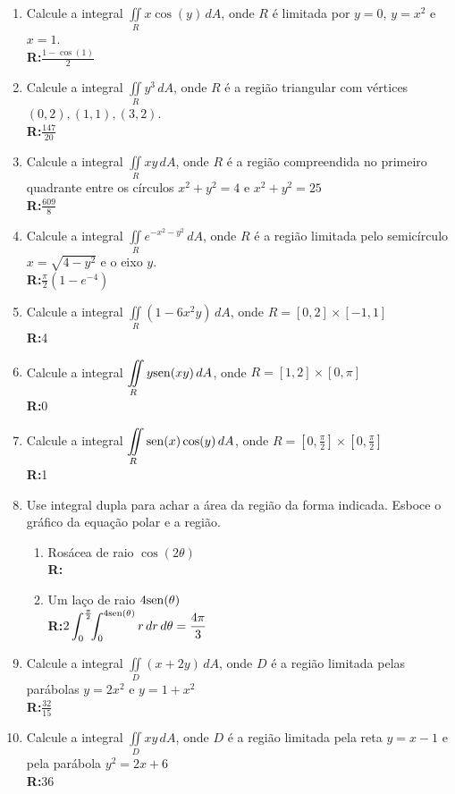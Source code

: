 \documentclass[oneside,a4paper,12pt]{article}
\newcommand{\sen}{{\rm sen}}
\newcommand{\R}{\\{\bf R:}}
\newcommand{\iintR}{\displaystyle \iint \limits_R}
\newcommand{\iintD}{\displaystyle \iint \limits_D}
\begin{document}
\begin{enumerate}
	\item Calcule a integral $\iintR x\cos(y)\,dA$, onde $R$ é limitada por $y=0$, $y=x^2$ e $x=1$. \R $\displaystyle \frac{1-\cos(1)}{2}$
	
	\item Calcule a integral $\iintR y^3\,dA$, onde $R$ é a região triangular com vértices $(0,2),(1,1),(3,2)$. \R $\displaystyle \frac{147}{20}$
	
	\item Calcule a integral $\iintR xy\,dA$, onde $R$ é a região compreendida no primeiro quadrante entre os círculos $x^2+y^2 = 4$ e $x^2+y^2 = 25$ \R $\displaystyle \frac{609}{8}$
	
	\item Calcule a integral $\iintR e^{-x^2-y^2}\,dA$, onde $R$ é a região limitada pelo semicírculo $x=\sqrt{4-y^2}$ e o eixo $y$. \R $\displaystyle \frac{\pi}{2}(1-e^{-4})$
	
	\item Calcule a integral $\iintR(1-6x^2y)\,dA$, onde $R=\left[0,2\right]\times\left[-1,1\right]$\R 4
	
	\item Calcule a integral $\iintR y\sen(xy)\,dA$, onde $R=\left[1,2\right]\times\left[0,\pi\right]$\R 0
	
	\item Calcule a integral $\iintR \sen(x)\cos(y) \,dA$, onde $R=\left[0,\displaystyle \frac{\pi}{2}\right]\times\left[0,\displaystyle \frac{\pi}{2}\right]$\R 1
	
	\item Use integral dupla para achar a área da região da forma indicada. Esboce o gráfico da equação polar e a região.
		\begin{enumerate}
			\item Rosácea de raio $\cos(2\theta)$\R
			\item Um laço de raio $4\sen(\theta)$\R $\displaystyle 2\int_{0}^{\frac{\pi}{2}}\!\!\int_{0}^{4\sen(\theta)}r\,dr\,d\theta = \frac{4\pi}{3}$
			
		\end{enumerate}
	
	\item Calcule a integral $\iintD(x + 2y) \,dA$, onde $D$ é a região limitada pelas parábolas $y=2x^2$ e $y=1+x^2$ \R $\displaystyle \frac{32}{15}$
	
	\item Calcule a integral $\iintD xy \,dA$, onde $D$ é a região limitada pela reta $y=x-1$ e pela parábola $y^2=2x+6$ \R $36$
	

\end{enumerate}
\end{document}
